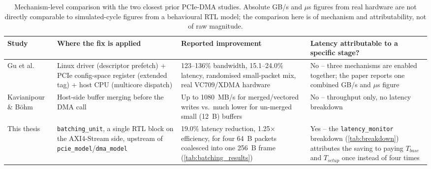 \begin{table}[htbp]
\centering
\begin{tabular}{@{}p{2.3cm}p{3.4cm}p{3.6cm}p{3.6cm}@{}}
\toprule
\textbf{Study} & \textbf{Where the fix is applied} & \textbf{Reported improvement} & \textbf{Latency attributable to a specific stage?} \\
\midrule
Gu et al.~\cite{gu2025cooptimization} & Linux driver (descriptor prefetch) + PCIe config-space register (extended tag) + host CPU (multicore dispatch) & 123--136\% bandwidth, 15.1--24.0\% latency, randomised small-packet mix, real VC709/XDMA hardware & No -- three mechanisms are enabled together; the paper reports one combined GB/s and $\mu$s figure \\
Kavianipour \& B{\"o}hm~\cite{kavianipour2012high} & Host-side buffer merging before the DMA call & Up to 1080~MB/s for merged/vectored writes vs.\ much lower for un-merged small (12~B) buffers & No -- throughput only, no latency breakdown \\
This thesis & \texttt{batching\_unit}, a single RTL block on the AXI4-Stream side, upstream of \texttt{pcie\_model}/\texttt{dma\_model} & 19.0\% latency reduction, 1.25$\times$ efficiency, for four 64~B packets coalesced into one 256~B frame (\autoref{tab:batching_results}) & Yes -- the \texttt{latency\_monitor} breakdown (\autoref{tab:breakdown}) attributes the saving to paying $T_{base}$ and $T_{setup}$ once instead of four times \\
\bottomrule
\end{tabular}
\caption{Mechanism-level comparison with the two closest prior PCIe-DMA studies. Absolute GB/s and $\mu$s figures from real hardware are not directly comparable to simulated-cycle figures from a behavioural RTL model; the comparison here is of mechanism and attributability, not of raw magnitude.}
\label{tab:comparison}
\end{table}

